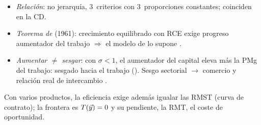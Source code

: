 \documentclass{article}
\begin{document}
\begin{columnas}
\begin{itemize}
\item \emph{Relación}: no jerarquía, 3~criterios con 3~proporciones constantes; coinciden en la CD.
\item \emph{Teorema de } (1961): crecimiento equilibrado con RCE exige progreso aumentador del trabajo $\Rightarrow$ el modelo de  lo supone .
\item \emph{Aumentar $\neq$ sesgar}: con $\sigma<1$, el aumentador del capital eleva más la PMg del trabajo: sesgado hacia el trabajo (). Sesgo sectorial $\to$ comercio y relación real de intercambio .
\end{itemize}

\begin{ideaclave}
Con varios productos, la eficiencia exige además igualar las RMST (curva de contrato); la frontera es $T(\vec{y})=0$ y su pendiente, la RMT, el coste de oportunidad.
\end{ideaclave}


\end{columnas}
\end{document}
